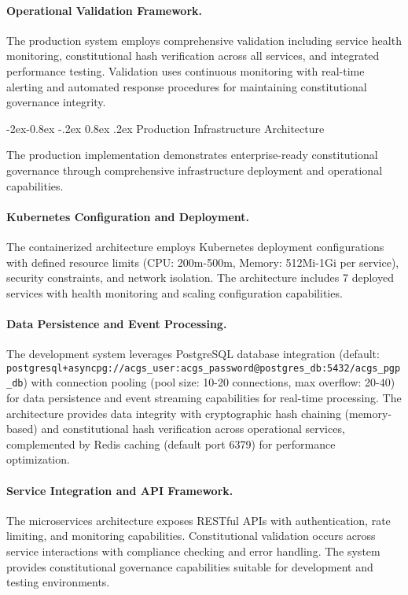 \documentclass[manuscript,screen,9pt]{acmart}
\makeatletter
\renewcommand\subsubsection{\@startsection{subsubsection}{3}{\z@}%
  {-2ex\@plus -0.8ex \@minus -.2ex}%
  {0.8ex \@plus .2ex}%
  {\normalfont\normalsize\bfseries}}
\makeatother
\begin{document}
\paragraph{Operational Validation Framework.} The production system employs comprehensive validation including service health monitoring, constitutional hash verification across all services, and integrated performance testing. Validation uses continuous monitoring with real-time alerting and automated response procedures for maintaining constitutional governance integrity.

\subsubsection{Production Infrastructure Architecture}
\label{subsubsec:production_infrastructure}

The production implementation demonstrates enterprise-ready constitutional governance through comprehensive infrastructure deployment and operational capabilities.

\paragraph{Kubernetes Configuration and Deployment.} The containerized architecture employs Kubernetes deployment configurations with defined resource limits (CPU: 200m-500m, Memory: 512Mi-1Gi per service), security constraints, and network isolation. The architecture includes 7 deployed services with health monitoring and scaling configuration capabilities.

\paragraph{Data Persistence and Event Processing.} The development system leverages PostgreSQL database integration (default: \texttt{postgresql+asyncpg://acgs\_user:acgs\_password@postgres\_db:5432/acgs\_pgp\_db}) with connection pooling (pool size: 10-20 connections, max overflow: 20-40) for data persistence and event streaming capabilities for real-time processing. The architecture provides data integrity with cryptographic hash chaining (memory-based) and constitutional hash verification across operational services, complemented by Redis caching (default port 6379) for performance optimization.

\paragraph{Service Integration and API Framework.} The microservices architecture exposes RESTful APIs with authentication, rate limiting, and monitoring capabilities. Constitutional validation occurs across service interactions with compliance checking and error handling. The system provides constitutional governance capabilities suitable for development and testing environments.
\end{document}
